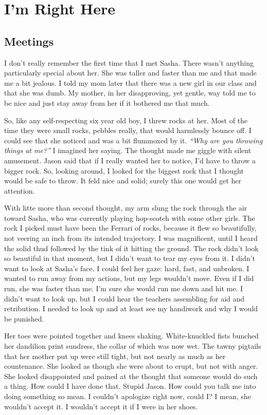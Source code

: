 \chapter*{I'm Right Here}

\section*{Meetings}

I don't really remember the first time that I met Sasha. There wasn't anything particularly special about her. She was taller and faster than me and that made me a bit jealous. I told my mom later that there was a new girl in our class and that she was dumb. My mother, in her disapproving, yet gentle, way told me to be nice and just stay away from her if it bothered me that much.

So, like any self-respecting six year old boy, I threw rocks at her. Most of the time they were small rocks, pebbles really, that would harmlessly bounce off. I could see that she noticed and was a bit flummoxed by it. \textit{``Why are you throwing things at me?''} I imagined her saying. The thought made me giggle with silent amusement. Jason said that if I really wanted her to notice, I'd have to throw a bigger rock. So, looking around, I looked for the biggest rock that I thought would be safe to throw. It feld nice and solid; surely this one would get her attention.

With litte more than second thought, my arm slung the rock through the air toward Sasha, who was currently playing hop-scotch with some other girls. The rock I picked must have been the Ferrari of rocks, because it flew so beautifully, not veering an inch from its intended trajectory. I was magnificent, until I heard the solid thud followed by the tink of it hitting the ground. The rock didn't look so beautiful in that moment, but I didn't want to tear my eyes from it. I didn't want to look at Sasha's face. I could feel her gaze: hard, fast, and unbroken. I wanted to run away from my actions, but my legs wouldn't move. Even if I did run, she was faster than me. I'm sure she would run me down and hit me. I didn't want to look up, but I could hear the teachers assembling for aid and retribution. I needed to look up and at least see my handiwork and why I would be punished.

Her toes were pointed together and knees shaking. White-knuckled fists bunched her dandilion print sundress, the collar of which was now wet. The tawny pigtails that her mother put up were still tight, but not nearly as much as her countenance. She looked as though she were about to erupt, but not with anger. She looked disappointed and pained at the thought that someone would do such a thing. How could I have done that. Stupid Jason. How could you talk me into doing something so mean. I couldn't apologize right now, could I? I mean, she wouldn't accept it. I wouldn't accept it if I were in her shoes.

